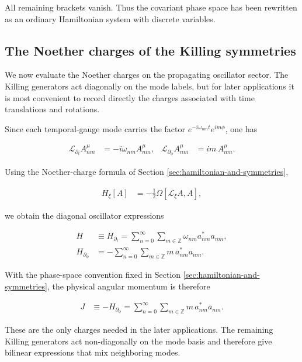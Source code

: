 All remaining brackets vanish. Thus the covariant phase space has been rewritten as an ordinary Hamiltonian system with discrete variables.

\subsection{The Noether charges of the Killing symmetries}\label{subsec:noether-charges-killing}

We now evaluate the Noether charges on the propagating oscillator sector. The Killing generators act diagonally on the mode labels, but for later applications it is most convenient to record directly the charges associated with time translations and rotations.

Since each temporal-gauge mode carries the factor $e^{-i\omega_{nm}t}e^{im\phi}$, one has

\begin{align}
\mathcal{L}_{\partial_{t}}A_{nm}^{\mu}&=-i\omega_{nm}A_{nm}^{\mu}, &
\mathcal{L}_{\partial_{\phi}}A_{nm}^{\mu}&=im\,A_{nm}^{\mu}.
\end{align}

Using the Noether-charge formula of Section \ref{sec:hamiltonian-and-symmetries},

\begin{align}
H_{\xi}[A]&=-\frac{1}{2}\Omega[\mathcal{L}_{\xi}A,A],
\end{align}

we obtain the diagonal oscillator expressions

\begin{align}
H&\equiv H_{\partial_{t}}=\sum_{n=0}^{\infty}\sum_{m\in\mathbb{Z}}\omega_{nm}a_{nm}^{*}a_{nm}, \\
H_{\partial_{\phi}}&=-\sum_{n=0}^{\infty}\sum_{m\in\mathbb{Z}}m\,a_{nm}^{*}a_{nm}.
\end{align}

With the phase-space convention fixed in Section \ref{sec:hamiltonian-and-symmetries}, the physical angular momentum is therefore

\begin{align}
J&\equiv -H_{\partial_{\phi}}=\sum_{n=0}^{\infty}\sum_{m\in\mathbb{Z}}m\,a_{nm}^{*}a_{nm}.
\end{align}

These are the only charges needed in the later applications. The remaining Killing generators act non-diagonally on the mode basis and therefore give bilinear expressions that mix neighboring modes.

